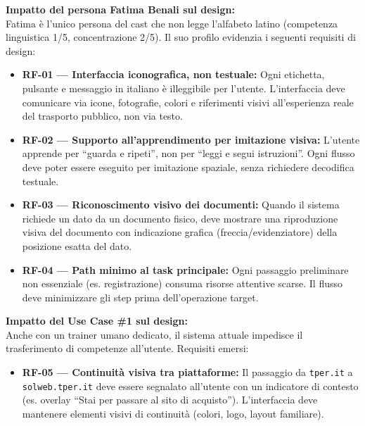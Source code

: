 ﻿\documentclass[11pt,a4paper]{article}
\begin{document}
\begin{center}
\vspace{0.3cm}

\begin{tcolorbox}[base]
    {\small
    \textbf{Impatto del persona Fatima Benali sul design:} \\[4pt]
    Fatima \`e l'unico persona del cast che non legge l'alfabeto latino (competenza linguistica 1/5, concentrazione 2/5). Il suo profilo evidenzia i seguenti requisiti di design:

    \begin{itemize}[leftmargin=*]
        \item \textbf{RF-01 --- Interfaccia iconografica, non testuale:}
        Ogni etichetta, pulsante e messaggio in italiano \`e illeggibile per l'utente. L'interfaccia deve comunicare via icone, fotografie, colori e riferimenti visivi all'esperienza reale del trasporto pubblico, non via testo.

        \item \textbf{RF-02 --- Supporto all'apprendimento per imitazione visiva:}
        L'utente apprende per ``guarda e ripeti'', non per ``leggi e segui istruzioni''. Ogni flusso deve poter essere eseguito per imitazione spaziale, senza richiedere decodifica testuale.

        \item \textbf{RF-03 --- Riconoscimento visivo dei documenti:}
        Quando il sistema richiede un dato da un documento fisico, deve mostrare una riproduzione visiva del documento con indicazione grafica (freccia/evidenziatore) della posizione esatta del dato.

        \item \textbf{RF-04 --- Path minimo al task principale:}
        Ogni passaggio preliminare non essenziale (es. registrazione) consuma risorse attentive scarse. Il flusso deve minimizzare gli step prima dell'operazione target.
    \end{itemize}
    }
\end{tcolorbox}

\vspace{0.3cm}

\begin{tcolorbox}[base]
    {\small
    \textbf{Impatto del Use Case \#1 sul design:} \\[4pt]
    Anche con un trainer umano dedicato, il sistema attuale impedisce il trasferimento di competenze all'utente. Requisiti emersi:

    \begin{itemize}[leftmargin=*]
        \item \textbf{RF-05 --- Continuità visiva tra piattaforme:}
        Il passaggio da \texttt{tper.it} a \texttt{solweb.tper.it} deve essere segnalato all'utente con un indicatore di contesto (es. overlay ``Stai per passare al sito di acquisto''). L'interfaccia deve mantenere elementi visivi di continuità (colori, logo, layout familiare).


\end{itemize}}
\end{tcolorbox}
\end{center}
\end{document}
